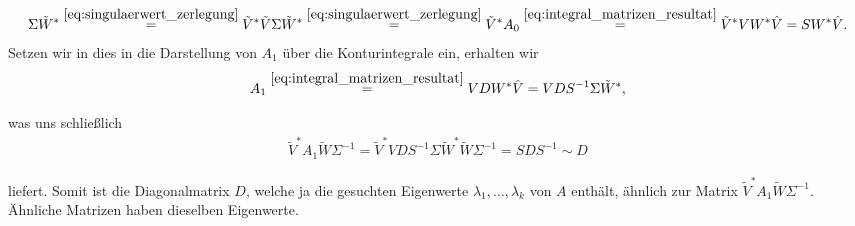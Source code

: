 \begin{align*}
    \Sigma \tilde W^\ast
    \stackrel
    {\eqref{eq:singulaerwert_zerlegung}}{=}
    \tilde V^\ast \tilde V \Sigma \tilde W^\ast
    \stackrel
    {
        \eqref{eq:singulaerwert_zerlegung}
    }{=}
    \tilde V^\ast A_0
    \stackrel
    {
        \eqref{eq:integral_matrizen_resultat}
    }{=}
    \tilde V^\ast V W^\ast \hat V
    =
    S W^\ast \hat V.
\end{align*}
Setzen wir in dies in die Darstellung von $A_1$ über die Konturintegrale ein, erhalten wir
\begin{align*}
    A_1
    \stackrel
    {
        \eqref{eq:integral_matrizen_resultat}
    }{=}
    V D W^\ast \hat V
    =
    V D S^{-1} \Sigma \tilde W^\ast,
\end{align*}

was uns schließlich
\begin{align*}
    \tilde V^\ast A_1 \tilde W \Sigma^{-1}
    =
    \tilde V^\ast V D S^{-1} \Sigma \tilde W^\ast \tilde W \Sigma^{-1}
    =
    S D S^{-1}
    \sim
    D
\end{align*}

liefert.
Somit ist die Diagonalmatrix $D$, welche ja die gesuchten Eigenwerte $\lambda_1, \dots, \lambda_k$ von $A$ enthält, ähnlich zur Matrix $\tilde V^\ast A_1 \tilde W \Sigma^{-1}$.
Ähnliche Matrizen haben dieselben Eigenwerte.
